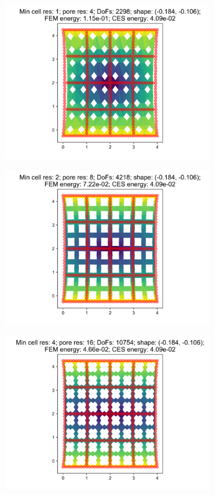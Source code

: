 \begin{figure}[H]
\begin{subfigure}{.45\textwidth}
  \centering
  \includegraphics[width=.8\linewidth]{lces/vis_tension/bm_2_mesh_0.png}
\end{subfigure}
\begin{subfigure}{.45\textwidth}
  \centering
  \includegraphics[width=.8\linewidth]{lces/vis_tension/bm_2_mesh_1.png}
\end{subfigure}
\newline
\begin{subfigure}{.45\textwidth}
  \centering
  \includegraphics[width=.8\linewidth]{lces/vis_tension/bm_2_mesh_2.png}

\end{subfigure}
\end{figure}
